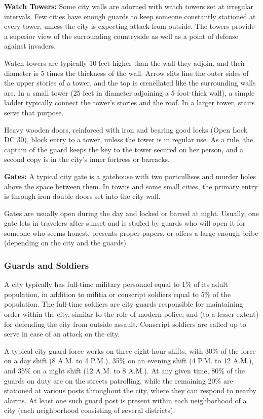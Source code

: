 \documentclass{article}
\begin{document}
\textbf{Watch Towers:} Some city walls are adorned with watch towers set at irregular 
intervals. Few cities have enough guards to keep someone constantly stationed at 
every tower, unless the city is expecting attack from outside. The towers provide 
a superior view of the surrounding countryside as well as a point of defense against 
invaders.

Watch towers are typically 10 feet higher than the wall they adjoin, and their 
diameter is 5 times the thickness of the wall. Arrow slits line the outer sides 
of the upper stories of a tower, and the top is crenellated like the surrounding 
walls are. In a small tower (25 feet in diameter adjoining a 5-foot-thick wall), 
a simple ladder typically connect the tower's stories and the roof. In a larger 
tower, stairs serve that purpose. 

Heavy wooden doors, reinforced with iron and bearing good locks (Open Lock DC 30), 
block entry to a tower, unless the tower is in regular use. As a rule, the captain 
of the guard keeps the key to the tower secured on her person, and a second copy 
is in the city's inner fortress or barracks.

\textbf{Gates:} A typical city gate is a gatehouse with two portcullises and murder 
holes above the space between them. In towns and some small cities, the primary 
entry is through iron double doors set into the city wall.

Gates are usually open during the day and locked or barred at night. Usually, one 
gate lets in travelers after sunset and is staffed by guards who will open it for 
someone who seems honest, presents proper papers, or offers a large enough bribe 
(depending on the city and the guards).

\vspace{12pt}
\subsubsection*{\textbf{Guards and Soldiers}}

A city typically has full-time military personnel equal to 1\% of its adult population, 
in addition to militia or conscript soldiers equal to 5\% of the population. The 
full-time soldiers are city guards responsible for maintaining order within the 
city, similar to the role of modern police, and (to a lesser extent) for defending 
the city from outside assault. Conscript soldiers are called up to serve in case 
of an attack on the city.

A typical city guard force works on three eight-hour shifts, with 30\% of the force 
on a day shift (8 {\footnotesize{}A}.{\footnotesize{}M}. to 4 {\footnotesize{}P}.{\footnotesize{}M}.), 
35\% on an evening shift (4 {\footnotesize{}P}.{\footnotesize{}M}. to 12 {\footnotesize{}A}.{\footnotesize{}M}.), 
and 35\% on a night shift (12 {\footnotesize{}A}.{\footnotesize{}M}. to 8 {\footnotesize{}A}.{\footnotesize{}M}.). 
At any given time, 80\% of the guards on duty are on the streets patrolling, while 
the remaining 20\% are stationed at various posts throughout the city, where they 
can respond to nearby alarms. At least one such guard post is present within each 
neighborhood of a city (each neighborhood consisting of several districts).
\end{document}
